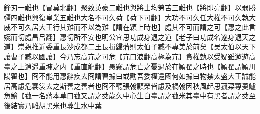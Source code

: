鋒刃一難也【冒莫北翻】聚致英豪二難也與將士均勞苦三難也【將即亮翻】以弱勝彊四難也興復皇業五難也大名不可久荷【荷下可翻】大功不可久任大權不可久執大威不可久居大王行其難而不以為難【謂在穎上時也】處其不可而謂之可【惠之此言婉而切處昌呂翻】惠切所不安也明公宜思功成身退之道【老子曰功成名遂身退天之道】崇親推近委重長沙成都二王長揖歸藩則太伯子臧不專美於前矣【吴太伯以天下讓曹子臧以國讓】今乃忘高亢之可危【亢口浪翻高極為亢】貪權埶以受疑雖遨遊高臺之上逍遥重墉之内【重直龍翻】愚竊謂危亡之憂過於在頴翟之時也【頴翟謂頴川陽翟也】冏不能用惠辭疾去冏謂曹攄曰或勸吾委權還國何如攄曰物禁太盛大王誠能居高慮危褰裳去之斯善之善者也冏不聽張翰顧榮皆慮及禍翰因秋風起思菰菜蓴羮鱸魚鱠【菰一名蔣本草曰菰又謂之茭歲久中心生白臺謂之菰米其臺中有黑者謂之茭至後結實乃雕胡黑米也蓴生水中葉